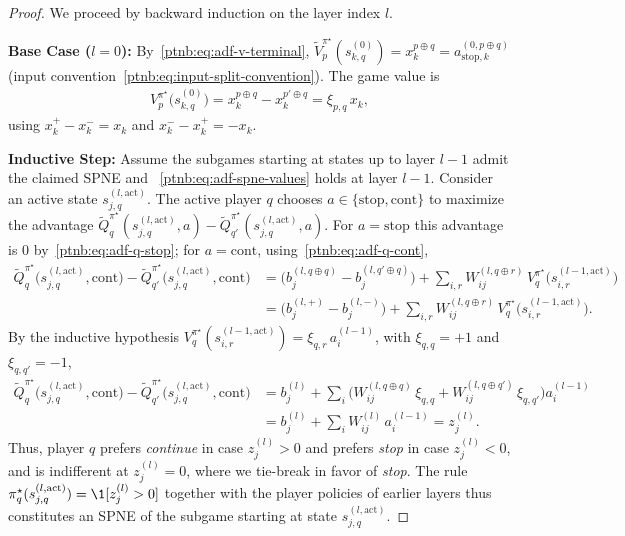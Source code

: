 \begin{proof}
We proceed by backward induction on the layer index $l$.

\textbf{Base Case ($l=0$):} By~\eqref{ptnb:eq:adf-v-terminal}, $\tilde{V}_p^{\pi^\star}(s_{k,q}^{(0)}) =
    x_k^{p \oplus q} = a_{\mathrm{stop},k}^{(0, p \oplus q)}$ (input
convention~\eqref{ptnb:eq:input-split-convention}). The game value is
\begin{align}
    V_p^{\pi^\star}\bigl(s_{k,q}^{(0)}\bigr)
    = x_k^{p \oplus q} - x_k^{p' \oplus q}
    = \xi_{p,q}\, x_k,
\end{align}
using $x_k^+ - x_k^- = x_k$ and $x_k^- - x_k^+ = -x_k$.

\textbf{Inductive Step:} Assume the subgames starting at states up to layer $l-1$ admit the claimed
SPNE and ~\eqref{ptnb:eq:adf-spne-values} holds at layer $l-1$. Consider an active state $s_{j,q}^{(l,
    \mathrm{act})}$. The active player $q$ chooses $a \in \{\mathrm{stop}, \mathrm{cont}\}$ to maximize
the advantage $\tilde{Q}_q^{\pi^\star}(s_{j,q}^{(l, \mathrm{act})}, a) -
    \tilde{Q}_{q'}^{\pi^\star}(s_{j,q}^{(l, \mathrm{act})}, a)$. For $a=\mathrm{stop}$ this advantage
is $0$ by~\eqref{ptnb:eq:adf-q-stop}; for $a=\mathrm{cont}$, using~\eqref{ptnb:eq:adf-q-cont},
\begin{align}
    \tilde{Q}_q^{\pi^\star}\bigl(s_{j,q}^{(l, \mathrm{act})}, \mathrm{cont}\bigr) -
    \tilde{Q}_{q'}^{\pi^\star}\bigl(s_{j,q}^{(l, \mathrm{act})}, \mathrm{cont}\bigr)
    &= \bigl(b_j^{(l, q \oplus q)} - b_j^{(l, q' \oplus q)}\bigr) + \sum_{i,r} W_{ij}^{(l, q \oplus
    r)}\, V_q^{\pi^\star}\bigl(s_{i,r}^{(l-1, \mathrm{act})}\bigr) \\
    &= \bigl(b_j^{(l,+)} - b_j^{(l,-)}\bigr) + \sum_{i,r} W_{ij}^{(l, q \oplus r)}\,
    V_q^{\pi^\star}\bigl(s_{i,r}^{(l-1, \mathrm{act})}\bigr).
\end{align}
By the inductive hypothesis $V_q^{\pi^\star}(s_{i,r}^{(l-1, \mathrm{act})}) = \xi_{q,r}\,
    a_i^{(l-1)}$, with $\xi_{q,q}=+1$ and $\xi_{q,q'}=-1$,
\begin{align}
    \tilde{Q}_q^{\pi^\star}\bigl(s_{j,q}^{(l, \mathrm{act})}, \mathrm{cont}\bigr) -
    \tilde{Q}_{q'}^{\pi^\star}\bigl(s_{j,q}^{(l, \mathrm{act})}, \mathrm{cont}\bigr)
    &= b_j^{(l)} + \sum_i \bigl( W_{ij}^{(l, q \oplus q)}\, \xi_{q,q} + W_{ij}^{(l, q \oplus q')}\,
    \xi_{q,q'} \bigr) a_i^{(l-1)} \\
    &= b_j^{(l)} + \sum_i W_{ij}^{(l)}\, a_i^{(l-1)} = z_j^{(l)}.
\end{align}
Thus, player $q$ prefers \emph{continue} in case $z_j^{(l)} > 0$ and prefers \emph{stop} in case
$z_j^{(l)} < 0$, and is indifferent at $z_j^{(l)} = 0$, where we tie-break in favor of \emph{stop}.
The rule $\pi_q^\star(s_{j,q}^{(l, \mathrm{act})}) = \1[z_j^{(l)} > 0]$ together with the player
policies of earlier layers thus constitutes an SPNE of the subgame starting at state $s_{j,q}^{(l
    ,\text{act})}$.


\end{proof}
